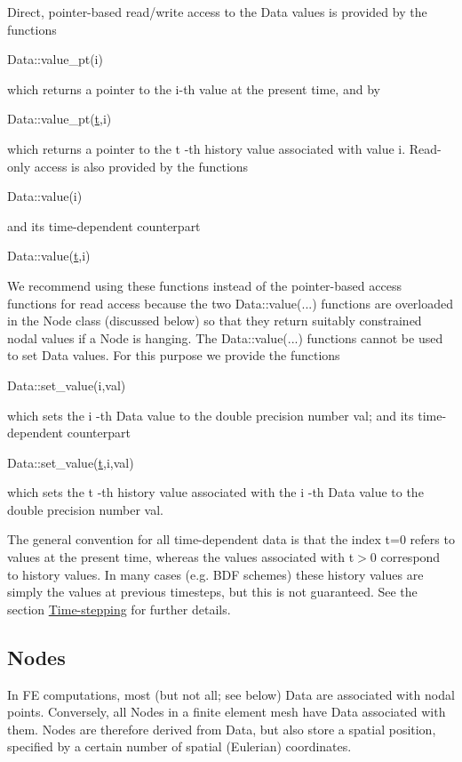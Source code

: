 Direct, pointer-\/based read/write access to the {\ttfamily Data} values is provided by the functions
\begin{DoxyCode}
Data::value\_pt(i) 
\end{DoxyCode}
 which returns a pointer to the i-\/th value at the present time, and by 
\begin{DoxyCode}
Data::value\_pt(\hyperlink{cfortran_8h_af6f0bd3dc13317f895c91323c25c2b8f}{t},i) 
\end{DoxyCode}
 which returns a pointer to the {\ttfamily t} -\/th history value associated with value {\ttfamily i}. Read-\/only access is also provided by the functions 
\begin{DoxyCode}
Data::value(i)
\end{DoxyCode}
 and its time-\/dependent counterpart 
\begin{DoxyCode}
Data::value(\hyperlink{cfortran_8h_af6f0bd3dc13317f895c91323c25c2b8f}{t},i)
\end{DoxyCode}
 We recommend using these functions instead of the pointer-\/based access functions for read access because the two {\ttfamily Data\+::value}(...) functions are overloaded in the {\ttfamily Node} class (discussed below) so that they return suitably constrained nodal values if a {\ttfamily Node} is hanging. The {\ttfamily Data\+::value}(...) functions cannot be used to set {\ttfamily Data} values. For this purpose we provide the functions 
\begin{DoxyCode}
Data::set\_value(i,val)
\end{DoxyCode}
 which sets the {\ttfamily i} -\/th {\ttfamily Data} value to the double precision number {\ttfamily val}; and its time-\/dependent counterpart 
\begin{DoxyCode}
Data::set\_value(\hyperlink{cfortran_8h_af6f0bd3dc13317f895c91323c25c2b8f}{t},i,val)
\end{DoxyCode}
 which sets the {\ttfamily t} -\/th history value associated with the {\ttfamily i} -\/th {\ttfamily Data} value to the double precision number {\ttfamily val}.

The general convention for all time-\/dependent data is that the index t=0 refers to values at the present time, whereas the values associated with t$>$0 correspond to history values. In many cases (e.\+g. B\+DF schemes) these history values are simply the values at previous timesteps, but this is not guaranteed. See the section \hyperlink{index_timestepping}{Time-\/stepping} for further details.\hypertarget{index_nodes}{}\subsection{Nodes}\label{index_nodes}
In FE computations, most (but not all; see below) {\ttfamily Data} are associated with nodal points. Conversely, all {\ttfamily Nodes} in a finite element mesh have {\ttfamily Data} associated with them. {\ttfamily Nodes} are therefore derived from {\ttfamily Data}, but also store a spatial position, specified by a certain number of spatial (Eulerian) coordinates.

